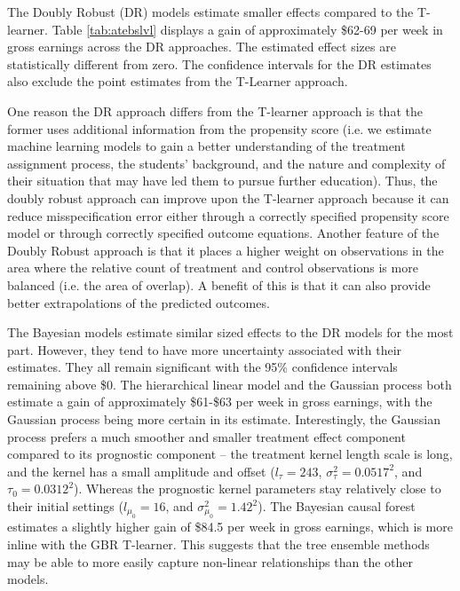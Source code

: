 \documentclass[12pt, a4paper]{article}
\begin{document}
The Doubly Robust (DR) models estimate smaller effects compared to the T-learner. Table \ref{tab:atebslvl} displays a gain of approximately \$62-69 per week in gross earnings across the DR approaches. The estimated effect sizes are statistically different from zero. The confidence intervals for the DR estimates also exclude the point estimates from the T-Learner approach.

One reason the DR approach differs from the T-learner approach is that the former uses additional information from the propensity score (i.e. we estimate machine learning models to gain a better understanding of the treatment assignment process, the students’ background, and the nature and complexity of their situation that may have led them to pursue further education). Thus, the doubly robust approach can improve upon the T-learner approach because it can reduce misspecification error either through a correctly specified propensity score model or through correctly specified outcome equations. Another feature of the Doubly Robust approach is that it places a higher weight on observations in the area where the relative count of treatment and control observations is more balanced (i.e. the area of overlap). A benefit of this is that it can also provide better extrapolations of the predicted outcomes. 

The Bayesian models estimate similar sized effects to the DR models for the
most part. However, they tend to have more uncertainty associated with their
estimates. They all remain significant with the 95\% confidence intervals
remaining above \$0. The hierarchical linear model and the Gaussian process
both estimate a gain of approximately \$61-\$63 per week in gross earnings,
with the Gaussian process being more certain in its estimate. Interestingly,
the Gaussian process prefers a much smoother and smaller treatment effect
component compared to its prognostic component -- the treatment kernel length
scale is long, and the kernel has a small amplitude and offset ($l_\tau = 243$,
$\sigma_\tau^2 = 0.0517^2$, and $\tau_0 = 0.0312^2$). Whereas the prognostic
kernel parameters stay relatively close to their initial settings ($l_{\mu_0} =
16$, and $\sigma^2_{\mu_0} = 1.42^2$). The Bayesian causal forest estimates a
slightly higher gain of \$84.5 per week in gross earnings, which is more inline
with the GBR T-learner. This suggests that the tree ensemble methods may be
able to more easily capture non-linear relationships than the other models.
\end{document}
